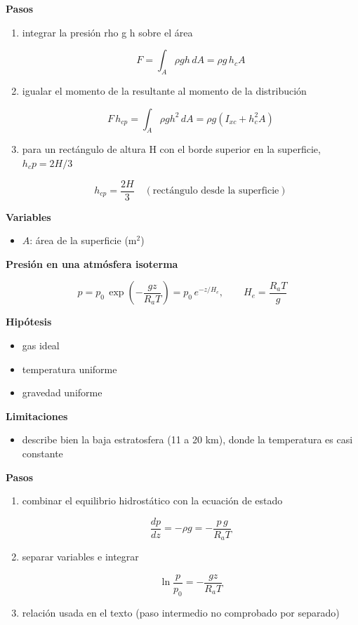\documentclass[10pt,openany]{book}
\begin{document}
\begin{tcolorbox}[title={Desarrollos del modelo}, studiumdef, breakable]
\noindent\textbf{Pasos}
\begin{enumerate}
\item
integrar la presión rho g h sobre el área

\[
F = \int_A \rho g h\,dA = \rho g\,h_c A
\]
\item
igualar el momento de la resultante al momento de la distribución

\[
F\,h_{cp} = \int_A \rho g h^{2}\,dA = \rho g\left(I_{xc} + h_c^{2} A\right)
\]
\item
para un rectángulo de altura H con el borde superior en la superficie, \(h_cp = 2H/3\)

\[
h_{cp} = \frac{2H}{3}\quad(\text{rectángulo desde la superficie})
\]
\end{enumerate}

\noindent\textbf{Variables}
\begin{itemize}
\item $A$: área de la superficie ($\mathrm{m}^{2}$)
\end{itemize}



\noindent\textbf{Presión en una atmósfera isoterma}

\[
p = p_0\,\exp\!\left(-\frac{g z}{R_a T}\right) = p_0\,e^{-z/H_e},\qquad H_e = \frac{R_a T}{g}
\]

\noindent\textbf{Hipótesis}
\begin{itemize}
\item gas ideal
\item temperatura uniforme
\item gravedad uniforme
\end{itemize}

\noindent\textbf{Limitaciones}
\begin{itemize}
\item describe bien la baja estratosfera (11 a 20 km), donde la temperatura es casi constante
\end{itemize}

\noindent\textbf{Pasos}
\begin{enumerate}
\item
combinar el equilibrio hidrostático con la ecuación de estado

\[
\frac{dp}{dz} = -\rho g = -\frac{p\,g}{R_a T}
\]
\item
separar variables e integrar

\[
\ln\frac{p}{p_0} = -\frac{g z}{R_a T}
\]
\item
relación usada en el texto (paso intermedio no comprobado por separado)


\end{enumerate}
\end{tcolorbox}
\end{document}
